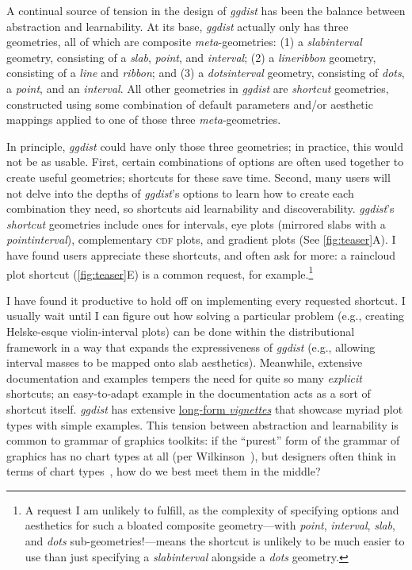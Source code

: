 \documentclass[journal]{vgtc}                     %
\begin{document}
A continual source of tension in the design of \textit{ggdist} has been the balance between abstraction and learnability. At its base, \textit{ggdist} actually only has three geometries, all of which are composite \textit{meta}-geometries: (1) a \textit{slabinterval} geometry, consisting of a \textit{slab}, \textit{point}, and \textit{interval}; (2) a \textit{lineribbon} geometry, consisting of a \textit{line} and \textit{ribbon}; and (3) a \textit{dotsinterval} geometry, consisting of \textit{dots}, a \textit{point}, and an \textit{interval}. All other geometries in \textit{ggdist} are \textit{shortcut} geometries, constructed using some combination of default parameters and/or aesthetic mappings applied to one of those three \textit{meta}-geometries.

In principle, \textit{ggdist} could have only those three geometries; in practice, this would not be as usable. First, certain combinations of options are often used together to create useful geometries; shortcuts for these save time. Second, many users will not delve into the depths of \textit{ggdist}'s options to learn how to create each combination they need, so shortcuts aid learnability and discoverability. \textit{ggdist}'s \textit{shortcut} geometries include ones for intervals, eye plots (mirrored slabs with a \textit{pointinterval}), complementary \textsc{cdf} plots, and gradient plots (See \cref{fig:teaser}A). 
I have found users appreciate these shortcuts, and often ask for more: a raincloud plot shortcut (\cref{fig:teaser}E) is a common request, for example.\footnote{A request I am unlikely to fulfill, as the complexity of specifying options and aesthetics for such a bloated composite geometry---with \textit{point}, \textit{interval}, \textit{slab}, and \textit{dots} sub-geometries!---means the shortcut is unlikely to be much easier to use than just specifying a \textit{slabinterval} alongside a \textit{dots} geometry.}

I have found it productive to hold off on implementing every requested shortcut. I usually wait until I can figure out how solving a particular problem (e.g., creating Helske-esque violin-interval plots) can be done within the distributional framework in a way that expands the expressiveness of \textit{ggdist} (e.g., allowing interval masses to be mapped onto slab aesthetics). Meanwhile, extensive documentation and examples tempers the need for quite so many \textit{explicit} shortcuts; an easy-to-adapt example in the documentation acts as a sort of shortcut itself. \textit{ggdist} has extensive \href{https://mjskay.github.io/ggdist/articles/}{long-form \textit{vignettes}} that showcase myriad plot types with simple examples. This tension between abstraction and learnability is common to grammar of graphics toolkits: if the ``purest'' form of the grammar of graphics has no chart types at all (per Wilkinson~\cite{wilkinson2012grammar}), but designers often think in terms of chart types~\cite{pu2023inpractice}, how do we best meet them in the middle?
\end{document}
